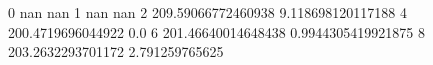 0 nan nan
1 nan nan
2 209.59066772460938 9.118698120117188
4 200.4719696044922 0.0
6 201.46640014648438 0.9944305419921875
8 203.2632293701172 2.791259765625
